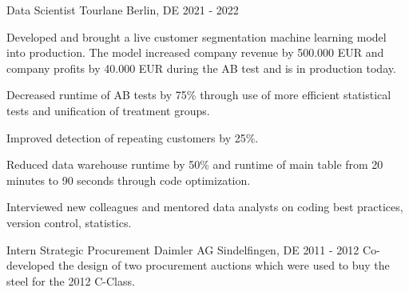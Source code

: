 \begin{section}[Experience]
  \entry%
    {Data Scientist} %
    {Tourlane} %
    {Berlin, DE} %
    {2021 - 2022} %
    {%
    \begin{entrylist}
      \item Developed and brought a live customer segmentation machine learning model into production. The model increased company revenue by 500.000 EUR and company profits by 40.000 EUR during the AB test and is in production today.
      \item Decreased runtime of AB tests by 75\% through use of more efficient statistical tests and unification of treatment groups.
      \item Improved detection of repeating customers by 25\%.
      \item Reduced data warehouse runtime by 50\% and runtime of main table from 20 minutes to 90 seconds through code optimization.
      \item Interviewed new colleagues and mentored data analysts on coding best practices, version control, statistics.
    \end{entrylist}
    }%

  \entry%
    {Intern Strategic Procurement} %
    {Daimler AG} %
    {Sindelfingen, DE} %
    {2011 - 2012} %
    {%
     Co-developed the design of two procurement auctions which were used to buy the steel for the 2012 C-Class.
    }%
\end{section}

